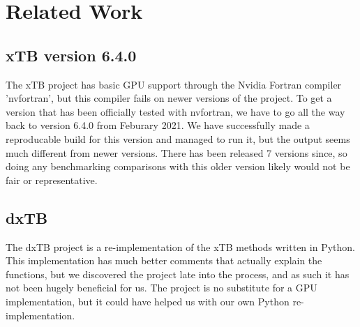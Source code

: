 \chapter{Related Work}

\section{xTB version 6.4.0}
The xTB project has basic GPU support through the Nvidia Fortran compiler 'nvfortran', but this compiler fails on newer versions of the project. To get a version that has been officially tested with nvfortran, we have to go all the way back to version 6.4.0 from Feburary 2021.
We have successfully made a reproducable build for this version and managed to run it, but the output seems much different from newer versions. There has been released 7 versions since, so doing any benchmarking comparisons with this older version likely would not be fair or representative.

\section{dxTB}
The dxTB project is a re-implementation of the xTB methods written in Python. This implementation has much better comments that actually explain the functions, but we discovered the project late into the process, and as such it has not been hugely beneficial for us.
The project is no substitute for a GPU implementation, but it could have helped us with our own Python re-implementation.
